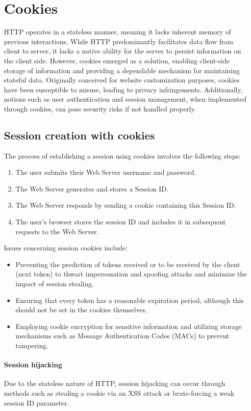 \section{Cookies}

HTTP operates in a stateless manner, meaning it lacks inherent memory of previous interactions. 
While HTTP predominantly facilitates data flow from client to server, it lacks a native ability for the server to persist information on the client side. 
However, cookies emerged as a solution, enabling client-side storage of information and providing a dependable mechanism for maintaining stateful data.
Originally conceived for website customization purposes, cookies have been susceptible to misuse, leading to privacy infringements. 
Additionally, notions such as user authentication and session management, when implemented through cookies, can pose security risks if not handled properly.

\subsection{Session creation with cookies}
The process of establishing a session using cookies involves the following steps:
\begin{enumerate}
\item The user submits their Web Server username and password.
\item The Web Server generates and stores a Session ID.
\item The Web Server responds by sending a cookie containing this Session ID.
\item The user's browser stores the session ID and includes it in subsequent requests to the Web Server.
\end{enumerate}
Issues concerning session cookies include:
\begin{itemize}
    \item Preventing the prediction of tokens received or to be received by the client (next token) to thwart impersonation and spoofing attacks and minimize the impact of session stealing.
    \item Ensuring that every token has a reasonable expiration period, although this should not be set in the cookies themselves.
    \item Employing cookie encryption for sensitive information and utilizing storage mechanisms such as Message Authentication Codes (MACs) to prevent tampering.
\end{itemize}
\paragraph*{Session hijacking}
Due to the stateless nature of HTTP, session hijacking can occur through methods such as stealing a cookie via an XSS attack or brute-forcing a weak session ID parameter.


